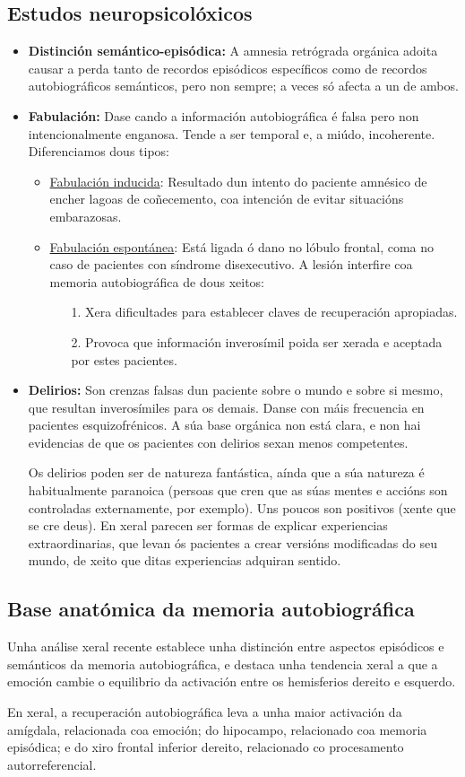 \documentclass[a4paper,11pt]{article}
\begin{document}
\subsection{Estudos neuropsicolóxicos}
\begin{itemize}
	\item \textbf{Distinción semántico-episódica:} A amnesia retrógrada orgánica adoita causar a
	perda tanto de recordos episódicos específicos como de recordos autobiográficos semánticos, pero
	non sempre; a veces só afecta a un de ambos.
	\item \textbf{Fabulación:} Dase cando a información autobiográfica é falsa pero non
	intencionalmente enganosa. Tende a ser temporal e, a miúdo, incoherente. Diferenciamos dous 
	tipos:
	\begin{itemize}
		\item \underline{Fabulación inducida}: Resultado dun intento do paciente amnésico de encher
		lagoas de coñecemento, coa intención de evitar situacións embarazosas.
		\item \underline{Fabulación espontánea}: Está ligada ó dano no lóbulo frontal, coma no caso
		de pacientes con síndrome disexecutivo. A lesión interfire coa memoria autobiográfica de 
		dous xeitos:
		\begin{enumerate}
			\item[1.] Xera dificultades para establecer claves de recuperación apropiadas.
			\item[2.] Provoca que información inverosímil poida ser xerada e aceptada por estes
			pacientes.
		\end{enumerate}
	\end{itemize}
	\item \textbf{Delirios:} Son crenzas falsas dun paciente sobre o mundo e sobre si mesmo, que
	resultan inverosímiles para os demais. Danse con máis frecuencia en pacientes esquizofrénicos. A 
	súa base orgánica non está clara, e non hai evidencias de que os pacientes con delirios sexan 
	menos competentes. 
	
	Os delirios poden ser de natureza fantástica, aínda que a súa natureza é habitualmente paranoica 
	(persoas que cren que as súas mentes e accións son controladas externamente, por exemplo). Uns 
	poucos son positivos (xente que se cre deus). En xeral parecen ser formas de explicar 
	experiencias extraordinarias, que levan ós pacientes a crear versións modificadas do seu mundo, 
	de xeito que ditas experiencias adquiran sentido.
\end{itemize}

\subsection{Base anatómica da memoria autobiográfica}
Unha análise xeral recente establece unha distinción entre aspectos episódicos e semánticos da memoria autobiográfica, e destaca unha tendencia xeral a que a emoción cambie o equilibrio da activación entre os hemisferios dereito e esquerdo.

En xeral, a recuperación autobiográfica leva a unha maior activación da amígdala, relacionada coa emoción; do hipocampo, relacionado coa memoria episódica; e do xiro frontal inferior dereito, relacionado co procesamento autorreferencial.
\end{document}
